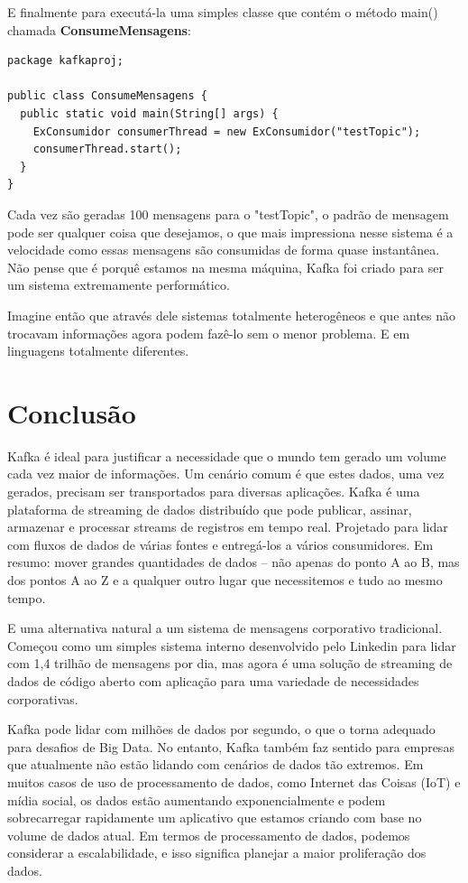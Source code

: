 \documentclass[a4paper,11pt]{article}
\begin{document}
E finalmente para executá-la uma simples classe que contém o método main() chamada \textbf{ConsumeMensagens}:
\begin{lstlisting}[]
package kafkaproj;

public class ConsumeMensagens {
  public static void main(String[] args) {
    ExConsumidor consumerThread = new ExConsumidor("testTopic");
    consumerThread.start();
  }
}
\end{lstlisting}

Cada vez são geradas 100 mensagens para o "testTopic", o padrão de mensagem pode ser qualquer coisa que desejamos, o que mais impressiona nesse sistema é a velocidade como essas mensagens são consumidas de forma quase instantânea. Não pense que é porquê estamos na mesma máquina, Kafka foi criado para ser um sistema extremamente performático. 

Imagine então que através dele sistemas totalmente heterogêneos e que antes não trocavam informações agora podem fazê-lo sem o menor problema. E em linguagens totalmente diferentes.
	
\section{Conclusão}
Kafka é ideal para justificar a necessidade que o mundo tem gerado um volume cada vez maior de informações. Um cenário comum é que estes dados, uma vez gerados, precisam ser transportados para diversas aplicações. Kafka é uma plataforma de streaming de dados distribuído que pode publicar, assinar, armazenar e processar streams de registros em tempo real. Projetado para lidar com fluxos de dados de várias fontes e entregá-los a vários consumidores. Em resumo: mover grandes quantidades de dados – não apenas do ponto A ao B, mas dos pontos A ao Z e a qualquer outro lugar que necessitemos e tudo ao mesmo tempo.

E uma alternativa natural a um sistema de mensagens corporativo tradicional. Começou como um simples sistema interno desenvolvido pelo Linkedin para lidar com 1,4 trilhão de mensagens por dia, mas agora é uma solução de streaming de dados de código aberto com aplicação para uma variedade de necessidades corporativas. 

Kafka pode lidar com milhões de dados por segundo, o que o torna adequado para desafios de Big Data. No entanto, Kafka também faz sentido para empresas que atualmente não estão lidando com cenários de dados tão extremos. Em muitos casos de uso de processamento de dados, como Internet das Coisas (IoT) e mídia social, os dados estão aumentando exponencialmente e podem sobrecarregar rapidamente um aplicativo que estamos criando com base no volume de dados atual. Em termos de processamento de dados, podemos considerar a escalabilidade, e isso significa planejar a maior proliferação dos dados. 
\end{document}
